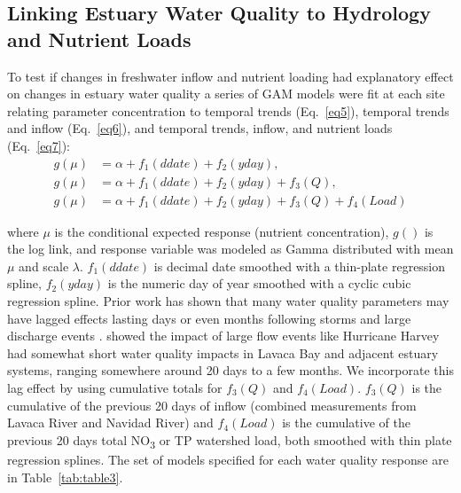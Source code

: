 \documentclass[fleqn,10pt,lineno]{wlpeerj} %
\begin{document}
\hypertarget{linking-estuary-water-quality-to-hydrology-and-nutrient-loads}{%
\subsection*{Linking Estuary Water Quality to Hydrology and Nutrient
Loads}\label{linking-estuary-water-quality-to-hydrology-and-nutrient-loads}}

To test if changes in freshwater inflow and nutrient loading had
explanatory effect on changes in estuary water quality a series of GAM
models were fit at each site relating parameter concentration to
temporal trends (Eq.~\ref{eq5}), temporal trends and inflow
(Eq.~\ref{eq6}), and temporal trends, inflow, and nutrient loads
(Eq.~\ref{eq7}): \begin{align}
g(\mu) &= \alpha + f_1(ddate) + f_2(yday), \label{eq5} \\
g(\mu) &= \alpha + f_1(ddate) + f_2(yday) + f_3(Q), \label{eq6} \\
g(\mu) &= \alpha + f_1(ddate) + f_2(yday) + f_3(Q) + f_4(Load) \label{eq7}
\end{align}

where \(\mu\) is the conditional expected response (nutrient
concentration), \(g()\) is the log link, and response variable was
modeled as Gamma distributed with mean \(\mu\) and scale \(\lambda\).
\(f_1(ddate)\) is decimal date smoothed with a thin-plate regression
spline, \(f_2(yday)\) is the numeric day of year smoothed with a cyclic
cubic regression spline. Prior work has shown that many water quality
parameters may have lagged effects lasting days or even months following
storms and large discharge events
\autocite{mooneyWatershedExportEvents2012a,wetzExtremeFutureEstuaries2013,bukaveckasInfluenceStormEvents2020,walkerTimescalesMagnitudeWater2021}.
\textcite{walkerTimescalesMagnitudeWater2021} showed the impact of large
flow events like Hurricane Harvey had somewhat short water quality
impacts in Lavaca Bay and adjacent estuary systems, ranging somewhere
around 20 days to a few months. We incorporate this lag effect by using
cumulative totals for \(f_3(Q)\) and \(f_4(Load)\). \(f_3(Q)\) is the
cumulative of the previous 20 days of inflow (combined measurements from
Lavaca River and Navidad River) and \(f_4(Load)\) is the cumulative of
the previous 20 days total NO\textsubscript{3} or TP watershed load,
both smoothed with thin plate regression splines. The set of models
specified for each water quality response are in Table~\ref{tab:table3}.
\end{document}
